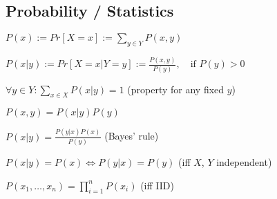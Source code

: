 \documentclass[a4paper, 11pt, landscape]{article}
\begin{document}
\begin{multicols*}{3}
\section{Probability / Statistics}
\begin{compactitem}
	\item $P(x) := Pr[X = x] := \sum_{y \in Y} P(x, y)$
	\item $P(x|y) := Pr[X = x | Y = y] := \frac{P(x,y)}{P(y)},\quad \text{if } P(y) > 0$
	\item $\forall y \in Y: \sum_{x \in X} P(x|y) = 1$ (property for any fixed $y$)
	\item $P(x, y) = P(x|y) P(y)$
	\item $P(x|y) = \frac{P(y|x)P(x)}{P(y)}$ (Bayes' rule)
	\item $P(x|y) = P(x) \Leftrightarrow P(y|x) = P(y)$ (iff $X$, $Y$ independent)
	\item $P(x_1, \ldots, x_n) = \prod_{i=1}^n P(x_i)$ (iff IID)
\end{compactitem}


\end{multicols*}
\end{document}
